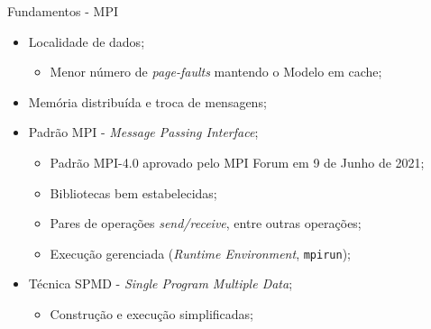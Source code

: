 \documentclass[aspectratio=1610,10pt]{beamer}
\begin{document}
\begin{frame}[fragile]{Fundamentos - MPI}
  \begin{itemize}%
    \item Localidade de dados;
    \begin{itemize}
      \item Menor número de \emph{page-faults} mantendo o Modelo em cache;
    \end{itemize}
    \item Memória distribuída e troca de mensagens;
    \item Padrão MPI - \emph{Message Passing Interface};
    \begin{itemize}
      \item Padrão MPI-4.0 aprovado pelo MPI Forum em 9 de Junho de 2021;
      \item Bibliotecas bem estabelecidas;
      \item Pares de operações \emph{send/receive}, entre outras operações;
      \item Execução gerenciada (\emph{Runtime Environment}, \texttt{mpirun});
    \end{itemize}
    \item Técnica SPMD - \emph{Single Program Multiple Data};
    \begin{itemize}
      \item Construção e execução simplificadas;
    \end{itemize}
  \end{itemize}
\end{frame}
\end{document}
